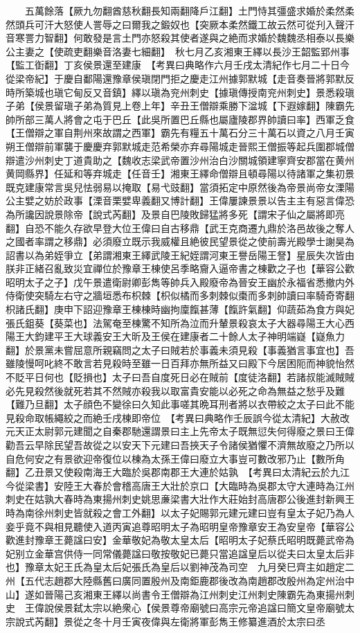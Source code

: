 　　五萬餘落【厥九勿翻酋慈秋翻長知兩翻降戶江翻】土門恃其彊盛求婚於柔然柔然頭兵可汗大怒使人詈辱之曰爾我之鍛奴也【突厥本柔然鐵工故云然可從刋入聲汗音寒詈力智翻】何敢發是言土門亦怒殺其使者遂與之絶而求婚於魏魏丞相泰以長樂公主妻之【使疏吏翻樂音洛妻七細翻】　秋七月乙亥湘東王繹以長沙王韶監郢州事【監工衘翻】丁亥侯景還至建康　【考異曰典略作六月壬戌太清紀作七月二十日今從梁帝紀】于慶自鄱陽還豫章侯瑱閉門拒之慶走江州據郭默城【走音奏晉將郭默反時所築城也瑱它甸反又音鎮】繹以瑱為兖州刺史【據瑱傳授南兖州刺史】景悉殺瑱子弟【侯景留瑱子弟為質見上卷上年】辛丑王僧辯乘勝下湓城【下遐嫁翻】陳霸先帥所部三萬人將會之屯于巴丘【此吳所置巴丘縣也屬廬陵郡界帥讀曰率】西軍乏食【王僧辯之軍自荆州來故謂之西軍】霸先有糧五十萬石分三十萬石以資之八月壬寅朔王僧辯前軍襲于慶慶弃郭默城走范希榮亦弃尋陽城走晉熙王僧振等起兵圍郡城僧辯遣沙州刺史丁道貴助之【魏收志梁武帝置沙州治白沙關城領建寧齊安郡當在黄州黄岡縣界】任延和等弃城走【任音壬】湘東王繹命僧辯且頓尋陽以待諸軍之集初景既克建康常言吳兒怯弱易以掩取【易弋豉翻】當須拓定中原然後為帝景尚帝女溧陽公主嬖之妨於政事【溧音栗嬖卑義翻又博計翻】王偉屢諫景景以告主主有惡言偉恐為所讒因說景除帝【說式芮翻】及景自巴陵敗歸猛將多死【謂宋子仙之屬將即亮翻】自恐不能久存欲早登大位王偉曰自古移鼎【武王克商遷九鼎於洛邑故後之奪人之國者率謂之移鼎】必須廢立既示我威權且絶彼民望景從之使前壽光殿學士謝昊為詔書以為弟姪爭立【弟謂湘東王繹武陵王紀姪謂河東王譽岳陽王詧】星辰失次皆由朕非正緒召亂致災宜禪位於豫章王棟使呂季略齎入逼帝書之棟歡之子也【華容公歡昭明太子之子】戊午景遣衛尉卿彭雋等帥兵入殿廢帝為晉安王幽於永福省悉撤内外侍衛使突騎左右守之牆垣悉布枳棘【枳似橘而多刺棘似棗而多刺帥讀曰率騎奇寄翻枳諸氏翻】庚申下詔迎豫章王棟棟時幽拘廩餼甚薄【餼許氣翻】仰蔬茹為食方與妃張氏鉏葵【葵菜也】法駕奄至棟驚不知所為泣而升輦景殺哀太子大器尋陽王大心西陽王大鈞建平王大球義安王大昕及王侯在建康者二十餘人太子神明端嶷【嶷魚力翻】於景黨未嘗屈意所親竊問之太子曰賊若於事義未須見殺【事義猶言事宜也】吾雖陵慢呵叱終不敢言若見殺時至雖一日百拜亦無所益又曰殿下今居困阨而神貌怡然不貶平日何也【貶損也】太子曰吾自度死日必在賊前【度徒洛翻】若諸叔能滅賊賊必先見殺然後就死若其不然賊亦殺我以取富貴安能以必死之命為無益之愁乎及難【難乃旦翻】太子顔色不變徐曰久知此事嗟其晩耳刑者將以衣帶絞之太子曰此不能見殺命取帳繩絞之而絶壬戌棟即帝位　【考異曰典略作壬辰誤今從太清紀】大赦改元天正太尉郭元建聞之自秦郡馳還謂景曰主上先帝太子既無愆失何得廢之景曰王偉勸吾云早除民望吾故從之以安天下元建曰吾挾天子令諸侯猶懼不濟無故廢之乃所以自危何安之有景欲迎帝復位以棟為太孫王偉曰廢立大事豈可數改邪乃止【數所角翻】乙丑景又使殺南海王大臨於吳郡南郡王大連於姑孰　【考異曰太清紀云於九江今從梁書】安陸王大春於會稽高唐王大壯於京口【大臨時為吳郡太守大連時為江州刺史在姑孰大春時為東揚州刺史姚思亷梁書大壯作大莊始封高唐郡公後進封新興王時為南徐州刺史皆就殺之會工外翻】以太子妃賜郭元建元建曰豈有皇太子妃乃為人妾乎竟不與相見聽使入道丙寅追尊昭明太子為昭明皇帝豫章安王為安皇帝【華容公歡進封豫章王薨諡曰安】金華敬妃為敬太皇太后【昭明太子妃蔡氏昭明既薨武帝為妃别立金華宫供侍一同常儀薨諡曰敬按敬妃已薨只當追諡皇后以從夫曰太皇太后非也】豫章太妃王氏為皇太后妃張氏為皇后以劉神茂為司空　九月癸巳齊主如趙定二州【五代志趙郡大陸縣舊曰廣同置殷州及南鉅鹿郡後改為南趙郡改殷州為定州治中山】遂如晉陽己亥湘東王繹以尚書令王僧辯為江州刺史江州刺史陳霸先為東揚州刺史　王偉說侯景弑太宗以絶衆心【侯景尊帝廟號曰高宗元帝追諡曰簡文皇帝廟號太宗說式芮翻】景從之冬十月壬寅夜偉與左衛將軍彭雋王修纂進酒於太宗曰丞